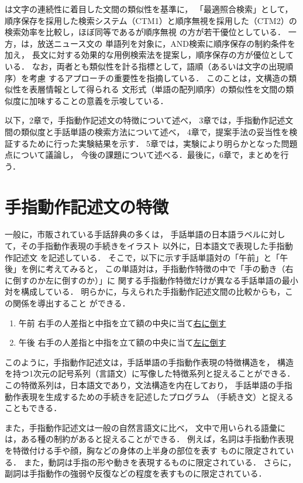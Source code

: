 \cite{SatoSatoshi1993}は文字の連続性に着目した文間の類似性を基準に，
「最適照合検索」として，順序保存を採用した検索システム（CTM1）\cite{SatoSatoshi1992}と順序無視を採用した（CTM2）の検索効率を比較し，ほぼ同等であるが順序無視
の方が若干優位としている．
一方，\cite{TanakaHideki1999}は，放送ニュース文の
単語列を対象に，AND検索に順序保存の制約条件を加え，
長文に対する効果的な用例検索法を提案し，順序保存の方が優位としている．
なお，両者とも類似性を計る指標として，語順（あるいは文字の出現順序）を考慮
するアプローチの重要性を指摘している．
このことは，文構造の類似性を表層情報として得られる
文形式（単語の配列順序）の類似性を文間の類似度に加味することの意義を示唆している．

以下，2章で，手指動作記述文の特徴について述べ，
3章では，手指動作記述文間の類似度と手話単語の検索方法について述べ，
4章で，提案手法の妥当性を検証するために行った実験結果を示す．
5章では，実験により明らかとなった問題点について議論し，
今後の課題について述べる．最後に，6章で，まとめを行う．

\section {手指動作記述文の特徴}\label{tokuchou}

一般に，市販されている手話辞典の多くは，
手話単語の日本語ラベルに対して，その手指動作表現の手続きをイラスト
以外に，日本語文で表現した手指動作記述文
を記述している\cite[など]{MaruyamaKoji1984,Watashi1986}．
そこで，以下に示す手話単語対の「午前」と「午後」を例に考えてみると，
この単語対は，手指動作特徴の中で「手の動き（右に倒すのか左に倒すのか）」に
関する手指動作特徴だけが異なる手話単語の最小対を構成している．
明らかに，与えられた手指動作記述文間の比較からも，この関係を導出すること
ができる．

\begin{enumerate}
\item {\gt 午前} 右手の人差指と中指を立て額の中央に当て\underline{右に倒す}
\item {\gt 午後} 右手の人差指と中指を立て額の中央に当て\underline{左に倒す}
\end{enumerate}

このように，手指動作記述文は，手話単語の手指動作表現の特徴構造を，
構造を持つ1次元の記号系列（言語文）に写像した特徴系列と捉えることができる．
この特徴系列は，日本語文であり，文法構造を内在しており，
手話単語の手指動作表現を生成するための手続きを記述したプログラム
（手続き文）と捉えることもできる．

また，手指動作記述文は一般の自然言語文に比べ，
文中で用いられる語彙には，ある種の制約があると捉えることができる．
例えば，名詞は手指動作表現を特徴付ける手や顔，胸などの身体の上半身の部位を表す
ものに限定されている．
また，動詞は手指の形や動きを表現するものに限定されている．
さらに，副詞は手指動作の強弱や反復などの程度を表すものに限定されている．

